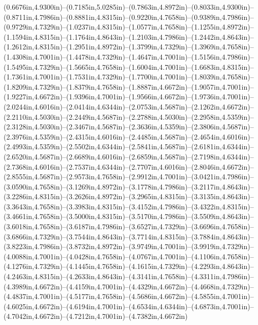 (0.6676in,4.9300in)--(0.7185in,5.0285in)--(0.7863in,4.8972in)--(0.8033in,4.9300in)--(0.8711in,4.7986in)--(0.8881in,4.8315in)--(0.9220in,4.7658in)--(0.9389in,4.7986in)--(0.9729in,4.7329in)--(1.0237in,4.8315in)--(1.0577in,4.7658in)--(1.1255in,4.8972in)--(1.1594in,4.8315in)--(1.1764in,4.8643in)--(1.2103in,4.7986in)--(1.2442in,4.8643in)--(1.2612in,4.8315in)--(1.2951in,4.8972in)--(1.3799in,4.7329in)--(1.3969in,4.7658in)--(1.4308in,4.7001in)--(1.4478in,4.7329in)--(1.4647in,4.7001in)--(1.5156in,4.7986in)--(1.5495in,4.7329in)--(1.5665in,4.7658in)--(1.6004in,4.7001in)--(1.6683in,4.8315in)--(1.7361in,4.7001in)--(1.7531in,4.7329in)--(1.7700in,4.7001in)--(1.8039in,4.7658in)--(1.8209in,4.7329in)--(1.8379in,4.7658in)--(1.8887in,4.6672in)--(1.9057in,4.7001in)--(1.9227in,4.6672in)--(1.9396in,4.7001in)--(1.9566in,4.6672in)--(1.9736in,4.7001in)--(2.0244in,4.6016in)--(2.0414in,4.6344in)--(2.0753in,4.5687in)--(2.1262in,4.6672in)--(2.2110in,4.5030in)--(2.2449in,4.5687in)--(2.2788in,4.5030in)--(2.2958in,4.5359in)--(2.3128in,4.5030in)--(2.3467in,4.5687in)--(2.3636in,4.5359in)--(2.3806in,4.5687in)--(2.3976in,4.5359in)--(2.4315in,4.6016in)--(2.4485in,4.5687in)--(2.4654in,4.6016in)--(2.4993in,4.5359in)--(2.5502in,4.6344in)--(2.5841in,4.5687in)--(2.6181in,4.6344in)--(2.6520in,4.5687in)--(2.6689in,4.6016in)--(2.6859in,4.5687in)--(2.7198in,4.6344in)--(2.7368in,4.6016in)--(2.7537in,4.6344in)--(2.7707in,4.6016in)--(2.8046in,4.6672in)--(2.8555in,4.5687in)--(2.9573in,4.7658in)--(2.9912in,4.7001in)--(3.0421in,4.7986in)--(3.0590in,4.7658in)--(3.1269in,4.8972in)--(3.1778in,4.7986in)--(3.2117in,4.8643in)--(3.2286in,4.8315in)--(3.2626in,4.8972in)--(3.2965in,4.8315in)--(3.3135in,4.8643in)--(3.3643in,4.7658in)--(3.3983in,4.8315in)--(3.4152in,4.7986in)--(3.4322in,4.8315in)--(3.4661in,4.7658in)--(3.5000in,4.8315in)--(3.5170in,4.7986in)--(3.5509in,4.8643in)--(3.6018in,4.7658in)--(3.6187in,4.7986in)--(3.6527in,4.7329in)--(3.6696in,4.7658in)--(3.6866in,4.7329in)--(3.7544in,4.8643in)--(3.7714in,4.8315in)--(3.7884in,4.8643in)--(3.8223in,4.7986in)--(3.8732in,4.8972in)--(3.9749in,4.7001in)--(3.9919in,4.7329in)--(4.0088in,4.7001in)--(4.0428in,4.7658in)--(4.0767in,4.7001in)--(4.1106in,4.7658in)--(4.1276in,4.7329in)--(4.1445in,4.7658in)--(4.1615in,4.7329in)--(4.2293in,4.8643in)--(4.2463in,4.8315in)--(4.2633in,4.8643in)--(4.3141in,4.7658in)--(4.3311in,4.7986in)--(4.3989in,4.6672in)--(4.4159in,4.7001in)--(4.4329in,4.6672in)--(4.4668in,4.7329in)--(4.4837in,4.7001in)--(4.5177in,4.7658in)--(4.5686in,4.6672in)--(4.5855in,4.7001in)--(4.6025in,4.6672in)--(4.6194in,4.7001in)--(4.6534in,4.6344in)--(4.6873in,4.7001in)--(4.7042in,4.6672in)--(4.7212in,4.7001in)--(4.7382in,4.6672in)
